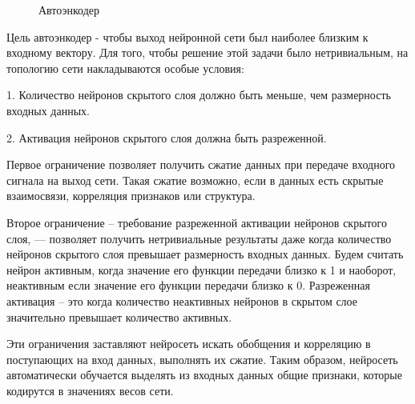 \documentclass[12pt]{article}
\begin{document}
  \begin{figure}[h]
    \noindent{}
    \caption{Автоэнкодер}
    \label{figCurves}
  \end{figure}

Цель автоэнкодер - чтобы выход нейронной сети был наиболее близким к входному вектору. Для того, чтобы решение этой задачи было нетривиальным, на топологию сети накладываются особые условия:

1. Количество нейронов скрытого слоя должно быть меньше, чем размерность входных данных.

2. Активация нейронов скрытого слоя должна быть разреженной.

Первое ограничение позволяет получить сжатие данных при передаче входного сигнала на выход сети. Такая сжатие возможно, если в данных есть скрытые взаимосвязи, корреляция признаков или структура.

Второе ограничение – требование разреженной активации нейронов скрытого слоя, — позволяет получить нетривиальные результаты даже когда количество нейронов скрытого слоя превышает размерность входных данных. Будем считать нейрон активным, когда значение его функции передачи близко к 1 и наоборот, неактивным если значение его функции передачи близко к 0. Разреженная активация – это когда количество неактивных нейронов в скрытом слое значительно превышает количество активных.

Эти ограничения заставляют нейросеть искать обобщения и корреляцию в поступающих на вход данных, выполнять их сжатие. Таким образом, нейросеть автоматически обучается выделять из входных данных общие признаки, которые кодирутся в значениях весов сети.
\end{document}
